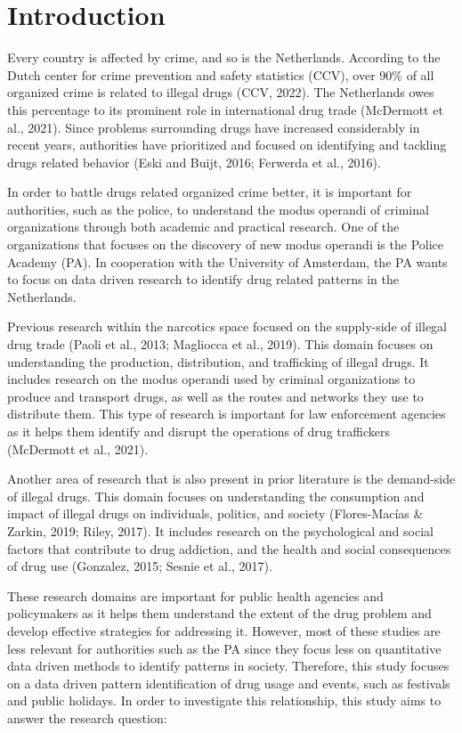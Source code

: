 \section{Introduction}

Every country is affected by crime, and so is the Netherlands. According to the Dutch center for crime prevention and safety statistics (CCV), over 90\% of all organized crime is related to illegal drugs (CCV, 2022). The Netherlands owes this percentage to its prominent role in international drug trade (McDermott et al., 2021). Since problems surrounding drugs have increased considerably in recent years, authorities have prioritized and focused on identifying and tackling drugs related behavior (Eski and Buijt, 2016; Ferwerda et al., 2016). 

In order to battle drugs related organized crime better, it is important for authorities, such as the police, to understand the modus operandi of criminal organizations through both academic and practical research. One of the organizations that focuses on the discovery of new modus operandi is the Police Academy (PA). In cooperation with the University of Amsterdam, the PA wants to focus on data driven research to identify drug related patterns in the Netherlands. 

Previous research within the narcotics space focused on the supply-side of illegal drug trade (Paoli et al., 2013; Magliocca et al., 2019). This domain focuses on understanding the production, distribution, and trafficking of illegal drugs. It includes research on the modus operandi used by criminal organizations to produce and transport drugs, as well as the routes and networks they use to distribute them. This type of research is important for law enforcement agencies as it helps them identify and disrupt the operations of drug traffickers (McDermott et al., 2021).

Another area of research that is also present in prior literature is the demand-side of illegal drugs. This domain focuses on understanding the consumption and impact of illegal drugs on individuals, politics, and society (Flores-Macías \& Zarkin, 2019; Riley, 2017). It includes research on the psychological and social factors that contribute to drug addiction, and the health and social consequences of drug use (Gonzalez, 2015; Sesnie et al., 2017). 

These research domains are important for public health agencies and policymakers as it helps them understand the extent of the drug problem and develop effective strategies for addressing it. However, most of these studies are less relevant for authorities such as the PA since they focus less on quantitative data driven methods to identify patterns in society. Therefore, this study focuses on a data driven pattern identification of drug usage and events, such as festivals and public holidays. In order to investigate this relationship, this study aims to answer the research question:\\


